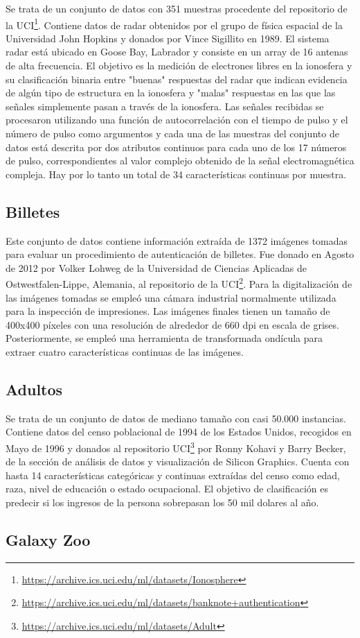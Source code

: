 Se trata de un conjunto de datos con 351 muestras procedente del repositorio de la UCI\footnote{\url{https://archive.ics.uci.edu/ml/datasets/Ionosphere}}. Contiene datos de radar obtenidos por el grupo de física espacial de la Universidad John Hopkins y donados por Vince Sigillito en 1989. El sistema radar está ubicado en Goose Bay, Labrador y consiste en un array de 16 antenas de alta frecuencia. El objetivo es la medición de electrones libres en la ionosfera y su clasificación binaria entre "buenas" respuestas del radar que indican evidencia de algún tipo de estructura en la ionosfera y "malas" respuestas en las que las señales simplemente pasan a través de la ionosfera. Las señales recibidas se procesaron utilizando una función de autocorrelación con el tiempo de pulso y el número de pulso como argumentos y cada una de las muestras del conjunto de datos está descrita por dos atributos continuos para cada uno de los 17 números de pulso, correspondientes al valor complejo obtenido de la señal electromagnética compleja. Hay por lo tanto un total de 34 características continuas por muestra.

\subsection{Billetes}

Este conjunto de datos contiene información extraída de 1372 imágenes tomadas para evaluar un procedimiento de autenticación de billetes. Fue donado en Agosto de 2012 por Volker Lohweg de la Universidad de Ciencias Aplicadas de Ostwestfalen-Lippe, Alemania, al repositorio de la UCI\footnote{\url{https://archive.ics.uci.edu/ml/datasets/banknote+authentication}}. Para la digitalización de las imágenes tomadas se empleó una cámara industrial normalmente utilizada para la inspección de impresiones. Las imágenes finales tienen un tamaño de 400x400 píxeles con una resolución de alrededor de 660 dpi en escala de grises. Posteriormente, se empleó una herramienta de transformada ondícula para extraer cuatro características continuas de las imágenes.

\subsection{Adultos}

Se trata de un conjunto de datos de mediano tamaño con casi 50.000 instancias. Contiene datos del censo poblacional de 1994 de los Estados Unidos, recogidos en Mayo de 1996 y donados al repositorio UCI\footnote{\url{https://archive.ics.uci.edu/ml/datasets/Adult}} por Ronny Kohavi y Barry Becker, de la sección de análisis de datos y visualización de Silicon Graphics. Cuenta con hasta 14 características categóricas y continuas extraídas del censo como edad, raza, nivel de educación o estado ocupacional. El objetivo de clasificación es predecir si los ingresos de la persona sobrepasan los 50 mil dolares al año.

\subsection{Galaxy Zoo}

\cite{galaxy-zoo}